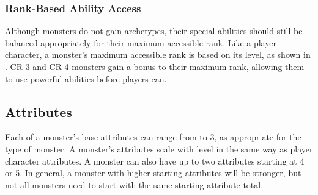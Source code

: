         \subsubsection{Rank-Based Ability Access}
            Although monsters do not gain archetypes, their special abilities should still be balanced appropriately for their maximum accessible rank.
            Like a player character, a monster's maximum accessible rank is based on its level, as shown in .
            CR 3 and CR 4 monsters gain a  bonus to their maximum rank, allowing them to use powerful abilities before players can.

    \subsection{Attributes}
        Each of a monster's base attributes can range from  to 3, as appropriate for the type of monster.
        A monster's attributes scale with level in the same way as player character attributes.
        A monster can also have up to two attributes starting at 4 or 5.
        In general, a monster with higher starting attributes will be stronger, but not all monsters need to start with the same starting attribute total.

